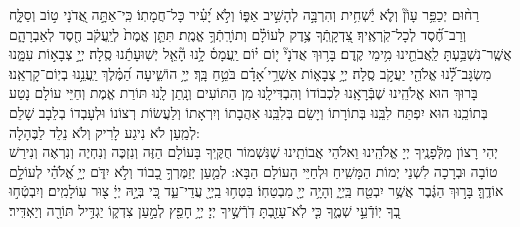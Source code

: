 \documentclass[twoside, openany, parskip=half, 11pt]{book}
\begin{document}
%
  רַח֨וּם יְכַפֵּ֥ר עָוֹן֘ וְלֹ֢א יַ֫שְׁחִ֥ית וְהִרְבָּ֣ה לְהָשִׁ֣יב אַפּ֑וֹ וְלֹ֣א יָ֝עִ֗יר כָּל־חֲמָתֽוֹ׃ כִּֽי־אַתָּ֣ה
%
   אֲ֭דֹנָי ט֣וֹב וְסַלָּ֑ח וְרַב־חֶ֝֗סֶד לְכָל־קֹֽרְאֶֽיךָ׃ צִ֭דְקָֽתְֿךָ
%
    צֶ֥דֶק לְעוֹלָ֗ם וְתוֹרָֽתְֿךָ֥ אֱמֶֽת׃ תִּתֵּ֤ן
%
    אֱמֶת֙ לְיַֽעֲקֹ֔ב חֶ֖סֶד לְאַבְרָהָ֑ם אֲשֶֽׁר־נִשְׁבַּ֥עְתָּ לַֽאֲבֹתֵ֖ינוּ מִ֥ימֵי קֶֽדֶם׃ בָּר֥וּךְ
%
     אֲדֹנָי֘ י֤וֹם י֗וֹם יַֽעֲמָס֫ לָ֥נוּ הָ֘אֵ֤ל יְשֽׁוּעָתֵ֬נוּ סֶֽלָה׃ יְיָ֣
%
      צְבָא֣וֹת עִמָּ֑נוּ מִשְׂגָּב־לָ֝֗נוּ אֱלֹהֵ֖י יַעֲקֹ֣ב סֶֽלָה׃ יְיָ֥
%
       צְבָא֑וֹת אַשְׁרֵ֥י ֝אָדָ֗ם בֹּטֵ֥חַ בָּֽךְ׃ יְיָ֥
%
        הוֹשִׁ֑יעָה הַ֝מֶּ֗לֶךְ יַֽעֲנֵ֥נוּ בְיֽוֹם־קָרְאֵֽנוּ׃ \\
 בָּרוּךְ הוּא אֱלֹהֵֽינוּ שֶׁבְּֿרָאָֽנוּ לִכְבוֹדוֹ וְהִבְדִּילָֽנוּ מִן הַתּוֹעִים וְנָֽתַן לָֽנוּ תּוֹרַת אֱמֶת וְחַיֵּי עוֹלָם נָטַע בְּתוֹכֵֽנוּ הוּא יִפְתַּח לִבֵּֽנוּ בְּתוֹרָתוֹ וְיָשֵׂם בְּלִבֵּֽנוּ אַהֲבָתוֹ וְיִרְאָתוֹ וְלַעֲשׂוֹת רְצוֹנוֹ וּלְעָבְדוֹ בְלֵבָב שָׁלֵם לְמַֽעַן לֹא נִיגַע לָרִיק וְלֹא נֵלֵד לַבֶּהָלָה:\\
 יְהִי רָצוֹן מִלְּֿפָנֶֽיךָ יְיָ אֱלֹהֵֽינוּ וֵאלֹהֵי אֲבוֹתֵֽינוּ שֶׁנִּשְׁמוֹר חֻקֶּֽיךָ בָּעוֹלָם הַזֶּה וְנִזְכֶּה וְנִחְיֶה וְנִרְאֶה וְנִירַשׁ טוֹבָה וּבְרָכָה לִשְׁנֵי יְמוֹת הַמָּשִֽׁיחַ וּלְחַיֵּי הָעוֹלָם הַבָּא: לְמַ֤עַן יְזַמֶּרְךָ֣ כָ֭בוֹד וְלֹ֣א יִדֹּ֑ם יְיָ֥ אֱ֝לֹהַ֗י לְעוֹלָ֣ם אוֹדֶֽךָּ׃ בָּר֣וּךְ הַגֶּ֔בֶר אֲשֶׁ֥ר יִבְטַ֖ח בַּֽיְיָ֑ וְהָיָ֥ה יְיָ֖ מִבְטַחֽוֹ׃ בִּטְח֥וּ
%
  בַֽיְיָ֖ עֲדֵי־עַ֑ד כִּ֚י בְּיָ֣הּ יְיָ֔ צ֖וּר עֽוֹלָמִֽים׃  וְיִבְטְֿח֣וּ
%
   בְ֭ךָ יֽוֹדְֿעֵ֣י שְׁמֶ֑ךָ כִּ֤י לֹֽא־עָזַ֖בְתָּ דֹֽרְֿשֶׁ֣יךָ יְיָ׃ יְיָ֥
%
חָפֵ֖ץ לְמַ֣עַן צִדְק֑וֹ יַגְדִּ֥יל תּוֹרָ֖ה וְיַאְדִּֽיר׃


 \\

\label{veyiten lecha}
\end{document}
